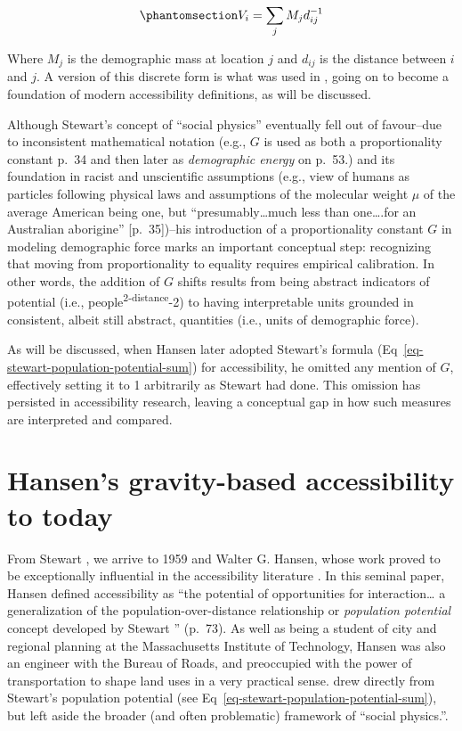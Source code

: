 \documentclass[
  10pt,
  letterpaper,
]{article}
\begin{document}
\begin{equation}\phantomsection\label{eq-stewart-population-potential-sum}{
V_i = \sum_j M_jd_{ij}^{-1}
}\end{equation}

\noindent Where \(M_j\) is the demographic mass at location \(j\) and
\(d_{ij}\) is the distance between \(i\) and \(j\). A version of this
discrete form is what was used in \citet{hansen1959}, going on to become
a foundation of modern accessibility definitions, as will be discussed.

Although Stewart's concept of ``social physics'' eventually fell out of
favour--due to inconsistent mathematical notation (e.g., \(G\) is used
as both a proportionality constant p.~34 and then later as
\emph{demographic energy} on p.~53.) and its foundation in racist and
unscientific assumptions (e.g., view of humans as particles following
physical laws and assumptions of the molecular weight \(\mu\) of the
average American being one, but ``presumably\ldots much less than
one\ldots.for an Australian aborigine'' {[}p.~35{]})--his introduction
of a proportionality constant \(G\) in modeling demographic force marks
an important conceptual step: recognizing that moving from
proportionality to equality requires empirical calibration. In other
words, the addition of \(G\) shifts results from being abstract
indicators of potential (i.e., people\textsuperscript{2-distance}-2) to
having interpretable units grounded in consistent, albeit still
abstract, quantities (i.e., units of demographic force).

As will be discussed, when Hansen later adopted Stewart's formula
(Eq~\ref{eq-stewart-population-potential-sum}) for accessibility, he
omitted any mention of \(G\), effectively setting it to 1 arbitrarily as
Stewart had done. This omission has persisted in accessibility research,
leaving a conceptual gap in how such measures are interpreted and
compared.

\section{Hansen's gravity-based accessibility to
today}\label{grav-to-today}

From Stewart \citep{stewartDemographicGravitationEvidence1948}, we
arrive to 1959 and Walter G. Hansen, whose work proved to be
exceptionally influential in the accessibility literature
\citep{hansen1959}. In this seminal paper, Hansen defined accessibility
as ``the potential of opportunities for interaction\ldots{} a
generalization of the population-over-distance relationship or
\emph{population potential} concept developed by Stewart
\citep{stewartDemographicGravitationEvidence1948}'' (p.~73). As well as
being a student of city and regional planning at the Massachusetts
Institute of Technology, Hansen was also an engineer with the Bureau of
Roads, and preoccupied with the power of transportation to shape land
uses in a very practical sense. \citet{hansen1959} drew directly from
Stewart's population potential (see
Eq~\ref{eq-stewart-population-potential-sum}), but left aside the
broader (and often problematic) framework of ``social physics.''.
\end{document}
